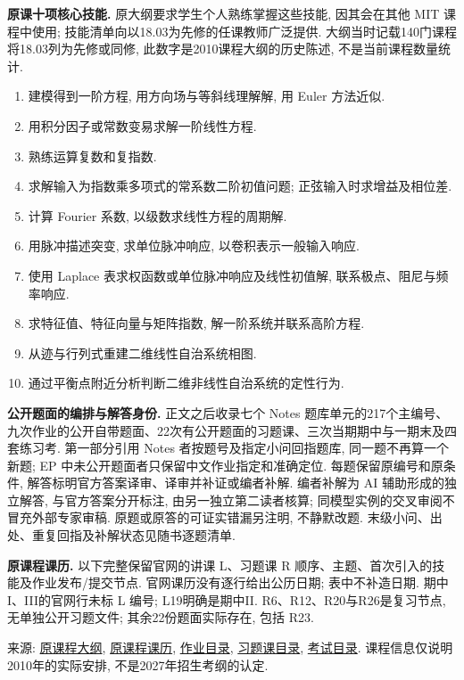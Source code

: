\noindent\textbf{原课十项核心技能.}
原大纲要求学生个人熟练掌握这些技能, 因其会在其他 MIT 课程中使用; 技能清单向以18.03为先修的任课教师广泛提供. 大纲当时记载140门课程将18.03列为先修或同修, 此数字是2010课程大纲的历史陈述, 不是当前课程数量统计.
\begin{enumerate}
\item 建模得到一阶方程, 用方向场与等斜线理解解, 用 Euler 方法近似.
\item 用积分因子或常数变易求解一阶线性方程.
\item 熟练运算复数和复指数.
\item 求解输入为指数乘多项式的常系数二阶初值问题; 正弦输入时求增益及相位差.
\item 计算 Fourier 系数, 以级数求线性方程的周期解.
\item 用脉冲描述突变, 求单位脉冲响应, 以卷积表示一般输入响应.
\item 使用 Laplace 表求权函数或单位脉冲响应及线性初值解, 联系极点、阻尼与频率响应.
\item 求特征值、特征向量与矩阵指数, 解一阶系统并联系高阶方程.
\item 从迹与行列式重建二维线性自治系统相图.
\item 通过平衡点附近分析判断二维非线性自治系统的定性行为.
\end{enumerate}

\noindent\textbf{公开题面的编排与解答身份.} 正文之后收录七个 Notes 题库单元的217个主编号、九次作业的公开自带题面、22次有公开题面的习题课、三次当期期中与一期末及四套练习考. 第一部分引用 Notes 者按题号及指定小问回指题库, 同一题不再算一个新题; EP 中未公开题面者只保留中文作业指定和准确定位. 每题保留原编号和原条件, 解答标明官方答案译审、译审并补证或编者补解. 编者补解为 AI 辅助形成的独立解答, 与官方答案分开标注, 由另一独立第二读者核算; 同模型实例的交叉审阅不冒充外部专家审稿. 原题或原答的可证实错漏另注明, 不静默改题. 末级小问、出处、重复回指及补解状态见随书逐题清单.

\noindent\textbf{原课程课历.} 以下完整保留官网的讲课 L、习题课 R 顺序、主题、首次引入的技能及作业发布/提交节点. 官网课历没有逐行给出公历日期; 表中不补造日期. 期中I、III的官网行未标 L 编号; L19明确是期中II. R6、R12、R20与R26是复习节点, 无单独公开习题文件; 其余22份题面实际存在, 包括 R23.


来源: \href{https://ocw.mit.edu/courses/18-03-differential-equations-spring-2010/pages/syllabus/}{原课程大纲}, \href{https://ocw.mit.edu/courses/18-03-differential-equations-spring-2010/pages/calendar/}{原课程课历}, \href{https://ocw.mit.edu/courses/18-03-differential-equations-spring-2010/pages/assignments/}{作业目录}, \href{https://ocw.mit.edu/courses/18-03-differential-equations-spring-2010/pages/recitations/}{习题课目录}, \href{https://ocw.mit.edu/courses/18-03-differential-equations-spring-2010/pages/exams/}{考试目录}. 课程信息仅说明2010年的实际安排, 不是2027年招生考纲的认定.
